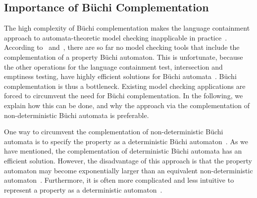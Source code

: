 

\subsection{Importance of Büchi Complementation}
\label{1_importance}
The high complexity of Büchi complementation makes the language containment approach to automata-theoretic model checking inapplicable in practice~\cite{1995_tasiran}. According to~\cite{2007_vardi_model_checking} and~\cite{2007_vardi}, there are so far no model checking tools that include the complementation of a property Büchi automaton. This is unfortunate, because the other operations for the language containment test, intersection and emptiness testing, have highly efficient solutions for Büchi automata~\cite{1996_vardi,2007_vardi_model_checking}. Büchi complementation is thus a bottleneck. Existing model checking applications are forced to circumvent the need for Büchi complementation. In the following, we explain how this can be done, and why the approach via the complementation of non-deterministic Büchi automata is preferable.

One way to circumvent the complementation of non-deterministic Büchi automata is to specify the property as a deterministic Büchi automaton~\cite{1995_tasiran,2007_vardi_model_checking}. As we have mentioned, the complementation of deterministic Büchi automata has an efficient solution. However, the disadvantage of this approach is that the property automaton may become exponentially larger than an equivalent non-deterministic automaton~\cite{1995_tasiran}. Furthermore, it is often more complicated and less intuitive to represent a property as a deterministic automaton~\cite{1995_tasiran}.

